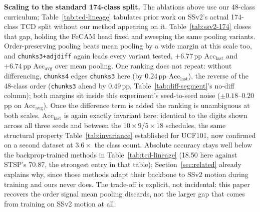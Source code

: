 \documentclass[a4paper,fleqn]{cas-dc}
\begin{document}
\textbf{Scaling to the standard 174-class split.} The ablations above use
our 48-class curriculum; Table~\ref{tab:tcd-lineage} tabulates prior work
on SSv2's actual 174-class TCD split without our method appearing on it.
Table~\ref{tab:ssv2-174} closes that gap, holding the FeCAM head fixed and
sweeping the same pooling variants. Order-preserving pooling beats mean
pooling by a wide margin at this scale too, and \texttt{chunks3+adjdiff}
again leads every variant tested, $+6.77$\,pp $\mathrm{Acc}_{\mathrm{last}}$
and $+6.74$\,pp $\mathrm{Acc}_{\mathrm{avg}}$ over mean pooling. One
ranking does not repeat: without differencing, \texttt{chunks4} edges
\texttt{chunks3} here (by $0.24$\,pp $\mathrm{Acc}_{\mathrm{last}}$), the
reverse of the 48-class order (\texttt{chunks3} ahead by $0.49$\,pp,
Table~\ref{tab:diff-segment}'s no-diff column); both margins sit inside
this experiment's seed-to-seed noise ($\pm0.18$--$0.20$\,pp on
$\mathrm{Acc}_{\mathrm{avg}}$). Once the difference term is added the
ranking is unambiguous at both scales. $\mathrm{Acc}_{\mathrm{last}}$ is
again exactly invariant here: identical to the digits shown across all
three seeds and between the $10{\times}9$/$5{\times}18$ schedules, the same
structural property Table~\ref{tab:invariance} established for UCF101, now
confirmed on a second dataset at $3.6\times$ the class count. Absolute
accuracy stays well below the backprop-trained methods in
Table~\ref{tab:tcd-lineage} (18.50 here against STSP's 70.87, the
strongest entry in that table); Section~\ref{sec:related} already
explains why, since those methods adapt their backbone to SSv2 motion
during training and ours never does. The trade-off is explicit, not
incidental: this paper recovers the order signal mean pooling discards,
not the larger gap that comes from training on SSv2 motion at all.
\end{document}
